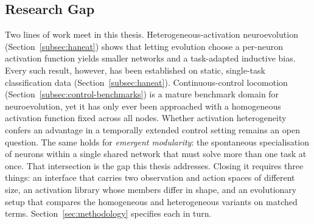 \documentclass[12pt]{article}
\begin{document}

\subsection{Research Gap}
\label{subsec:research-gap-and-contribution}


Two lines of work meet in this thesis.
Heterogeneous-activation neuroevolution (Section~\ref{subsec:haneat}) shows that letting evolution choose a per-neuron activation function yields smaller networks and a task-adapted inductive bias.
Every such result, however, has been established on static, single-task classification data (Section~\ref{subsec:haneat}).
Continuous-control locomotion (Section~\ref{subsec:control-benchmarks}) is a mature benchmark domain for neuroevolution, yet it has only ever been approached with a homogeneous activation function fixed across all nodes.
Whether activation heterogeneity confers an advantage in a temporally extended control setting remains an open question.
The same holds for \emph{emergent modularity}: the spontaneous specialisation of neurons within a single shared network that must solve more than one task at once.
That intersection is the gap this thesis addresses.
Closing it requires three things: an interface that carries two observation and action spaces of different size, an activation library whose members differ in shape, and an evolutionary setup that compares the homogeneous and heterogeneous variants on matched terms.
Section~\ref{sec:methodology} specifies each in turn.
\end{document}
